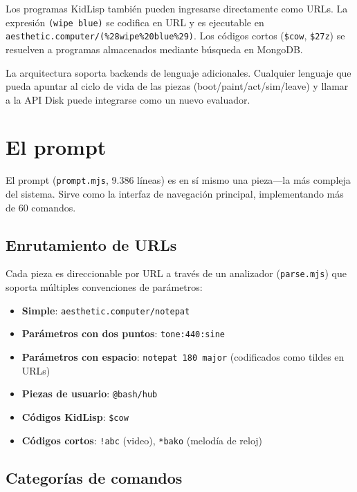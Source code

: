 \documentclass[10pt,letterpaper,twocolumn]{article}
\begin{document}
Los programas KidLisp también pueden ingresarse directamente como URLs. La expresión \texttt{(wipe blue)} se codifica en URL y es ejecutable en \texttt{aesthetic.computer/(\%28wipe\%20blue\%29)}. Los códigos cortos (\texttt{\$cow}, \texttt{\$27z}) se resuelven a programas almacenados mediante búsqueda en MongoDB.

La arquitectura soporta backends de lenguaje adicionales. Cualquier lenguaje que pueda apuntar al ciclo de vida de las piezas (boot/paint/act/sim/leave) y llamar a la API Disk puede integrarse como un nuevo evaluador.


\section{El prompt}
\label{sec:prompt}

El prompt (\texttt{prompt.mjs}, 9.386 líneas) es en sí mismo una pieza---la más compleja del sistema. Sirve como la interfaz de navegación principal, implementando más de 60 comandos.

\subsection{Enrutamiento de URLs}

Cada pieza es direccionable por URL a través de un analizador (\texttt{parse.mjs}) que soporta múltiples convenciones de parámetros:

\begin{itemize}
  \item \textbf{Simple}: \texttt{aesthetic.computer/notepat}
  \item \textbf{Parámetros con dos puntos}: \texttt{tone:440:sine}
  \item \textbf{Parámetros con espacio}: \texttt{notepat 180 major} (codificados como tildes en URLs)
  \item \textbf{Piezas de usuario}: \texttt{@bash/hub}
  \item \textbf{Códigos KidLisp}: \texttt{\$cow}
  \item \textbf{Códigos cortos}: \texttt{!abc} (video), \texttt{*bako} (melodía de reloj)
\end{itemize}

\subsection{Categorías de comandos}
\end{document}

